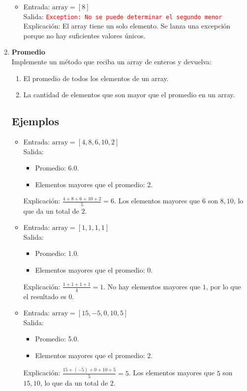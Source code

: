 \begin{enumerate}
\begin{itemize}
        \item Entrada: \( \text{array} = [8] \)\\
        Salida: \textcolor{red}{\texttt{Exception: No se puede determinar el segundo menor}}\\
        Explicación: El array tiene un solo elemento. Se lanza una excepción porque no hay suficientes valores únicos.
    \end{itemize}

    \item \textbf{Promedio}\\
    Implemente un método que reciba un array de enteros y devuelva: 
    \begin{enumerate}
        \item El promedio de todos los elementos de un array.
        \item La cantidad de elementos que son mayor que el promedio en un array.
    \end{enumerate}
    \subsection*{Ejemplos}
    \begin{itemize}
        \item Entrada: \( \text{array} = [4, 8, 6, 10, 2] \)\\
        Salida: 
        \begin{itemize}
            \item Promedio: 6.0.
            \item Elementos mayores que el promedio: 2.
        \end{itemize}
        Explicación: \(\frac{4 + 8 + 6 + 10 + 2}{5} = 6\).  
        Los elementos mayores que \( 6 \) son \( 8, 10 \), lo que da un total de \( 2 \).
    
        \item Entrada: \( \text{array} = [1, 1, 1, 1] \)\\
        Salida: 
        \begin{itemize}
            \item Promedio: 1.0.
            \item Elementos mayores que el promedio: 0.
        \end{itemize}
        Explicación: \(\frac{1 + 1 + 1 + 1}{4} = 1\).  
        No hay elementos mayores que \( 1 \), por lo que el resultado es \( 0 \).
    
        \item Entrada: \( \text{array} = [15, -5, 0, 10, 5] \)\\
        Salida: 
        \begin{itemize}
            \item Promedio: 5.0.
            \item Elementos mayores que el promedio: 2.
        \end{itemize}
        Explicación: \(\frac{15 + (-5) + 0 + 10 + 5}{5} = 5\).  
        Los elementos mayores que \( 5 \) son \( 15, 10 \), lo que da un total de \( 2 \).
    

\end{itemize}
\end{enumerate}
